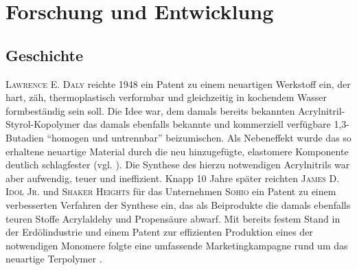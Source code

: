 \chapter{Forschung und Entwicklung}
    \section{Geschichte}\label{sec:geschichte}
        \textsc{Lawrence E. Daly} reichte 1948 ein Patent zu einem neuartigen Werkstoff ein, der hart, zäh, thermoplastisch verformbar
        und gleichzeitig in kochendem Wasser formbeständig sein soll. Die Idee war, dem damals bereits bekannten Acrylnitril-Styrol-Kopolymer
        das damals ebenfalls bekannte und kommerziell verfügbare 1,3-Butadien \enquote{homogen und untrennbar}
        beizumischen. Als Nebeneffekt wurde das so erhaltene neuartige Material durch die neu hinzugefügte, elastomere Komponente
        deutlich schlagfester (vgl. \cite{ABS.patent.1948.Daly.10191946}).
        \medskip
        Die Synthese des hierzu notwendigen Acrylnitrils war aber aufwendig, teuer und ineffizient. Knapp 10 Jahre später
        reichten \textsc{James D. Idol Jr.} und \textsc{Shaker Heights} für das Unternehmen \textsc{Sohio} ein Patent zu einem verbesserten Verfahren
        der Synthese ein, das als Beiprodukte die damals ebenfalls teuren Stoffe Acrylaldehy und Propensäure abwarf. Mit
        bereits festem Stand in der Erdölindustrie und einem Patent zur effizienten Produktion eines der notwendigen Monomere        
        folgte eine umfassende Marketingkampagne rund um das neuartige Terpolymer \cite{history.of.sohio.process.booklet.2021,sohio.process.patent.1959.9201957}.
        
